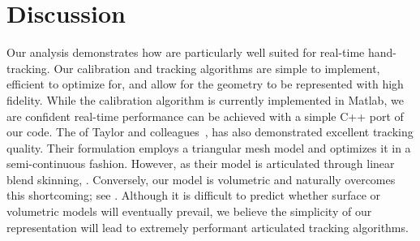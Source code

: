 

\section{Discussion}
\label{sec:discussion}


Our analysis demonstrates how  are particularly well suited for real-time hand-tracking. Our calibration and tracking algorithms are simple to implement, efficient to optimize for, and allow for the geometry to be represented with high fidelity. 
While the calibration algorithm is currently implemented in Matlab, we are confident real-time performance can be achieved with a simple C++ port of our code. 
% 
The  of Taylor and colleagues~\cite{taylor2016concerto}, has also demonstrated excellent tracking quality. Their formulation employs a triangular mesh model and optimizes it in a semi-continuous fashion. However, as their model is articulated through linear blend skinning, . Conversely, our model is volumetric and naturally overcomes this shortcoming; see \VideoNoJointCollapse{}.
% 
Although it is difficult to predict whether surface or volumetric models will eventually prevail, we believe the simplicity of our representation will lead to extremely performant articulated tracking algorithms.


